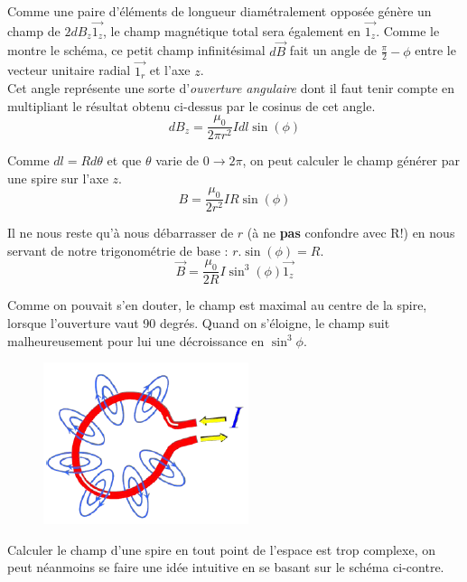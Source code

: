 \documentclass	[11pt, a4paper, openany]{book}
\begin{document}
Comme une paire d'éléments de longueur diamétralement opposée génère un champ de $2dB_z\vec{1_z}$, le champ magnétique total sera également en $\vec{1_z}$. Comme le montre le schéma, ce petit champ infinitésimal $d\vec{B}$ fait un angle de $\frac{\pi}{2} - \phi$ entre le vecteur unitaire radial $\vec{1_r}$ et l'axe $z$.\\

Cet angle représente une sorte d'\textit{ouverture angulaire} dont il faut tenir compte en multipliant le résultat obtenu ci-dessus par le cosinus de cet angle.
\begin{equation}
dB_z = \frac{\mu_0}{2\pi r^2}Idl\sin (\phi)
\end{equation}

Comme $dl = Rd\theta$ et que $\theta$ varie de $0 \rightarrow 2\pi$, on peut calculer le champ générer par une spire sur l'axe $z$.
\begin{equation}
B = \frac{\mu_0}{2 r^2} IR \sin (\phi)
\end{equation}

Il ne nous reste qu'à nous débarrasser de $r$ (à ne \textbf{pas} confondre avec R!) en nous servant de notre trigonométrie de base : $r.\sin (\phi) = R$.
\begin{equation}
\vec{B} = \frac{\mu_0}{2R}I \sin^3(\phi)\vec{1_z}
\end{equation}


Comme on pouvait s'en douter, le champ est maximal au centre de la spire, lorsque l'ouverture vaut 90 degrés. Quand on s'éloigne, le champ suit malheureusement pour lui une décroissance en $\sin^3\phi$.\\

\begin{figure}
\includegraphics[scale=0.50]{magneto/image10.png}
\end{figure}

Calculer le champ d'une spire en tout point de l'espace est trop complexe, on peut néanmoins se faire une idée intuitive en se basant sur le schéma ci-contre.
\end{document}
